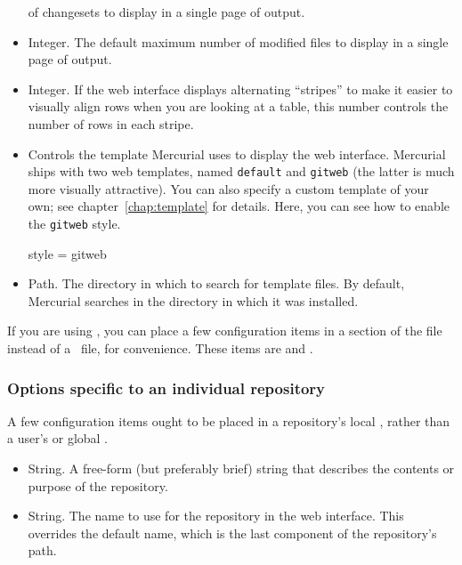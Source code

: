 \begin{itemize}
  of changesets to display in a single page of output.
\item[\rcitem{web}{maxfiles}] Integer.  The default maximum number
  of modified files to display in a single page of output.
\item[\rcitem{web}{stripes}] Integer.  If the web interface displays
  alternating ``stripes'' to make it easier to visually align rows
  when you are looking at a table, this number controls the number of
  rows in each stripe.
\item[\rcitem{web}{style}] Controls the template Mercurial uses to
  display the web interface.  Mercurial ships with two web templates,
  named \texttt{default} and \texttt{gitweb} (the latter is much more
  visually attractive).  You can also specify a custom template of
  your own; see chapter~\ref{chap:template} for details.  Here, you
  can see how to enable the \texttt{gitweb} style.
  \begin{codesample4}
    [web]
    style = gitweb
  \end{codesample4}
\item[\rcitem{web}{templates}] Path.  The directory in which to search
  for template files.  By default, Mercurial searches in the directory
  in which it was installed.
\end{itemize}
If you are using , you can place a few
configuration items in a  section of the
 file instead of a \hgrc\ file, for
convenience.  These items are  and
.

\subsubsection{Options specific to an individual repository}

A few  configuration items ought to be placed in a
repository's local , rather than a user's or
global \hgrc.
\begin{itemize}
\item[\rcitem{web}{description}] String.  A free-form (but preferably
  brief) string that describes the contents or purpose of the
  repository.
\item[\rcitem{web}{name}] String.  The name to use for the repository
  in the web interface.  This overrides the default name, which is the
  last component of the repository's path.
\end{itemize}

